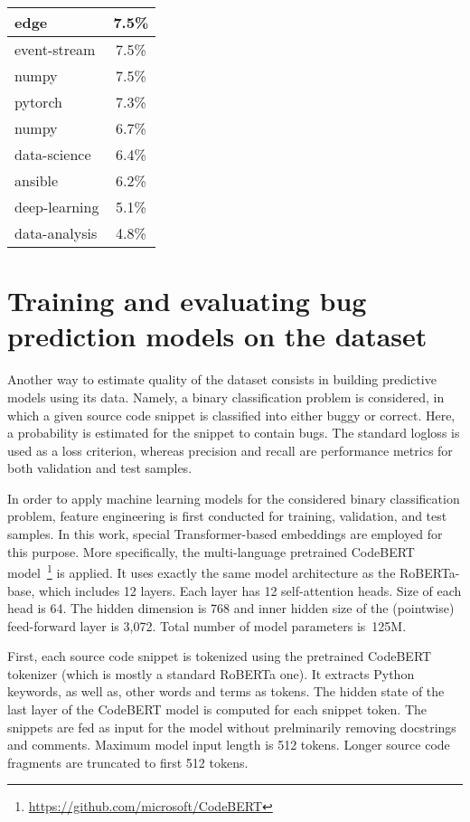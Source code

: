\documentclass[10pt,conference]{IEEEtran}
\begin{document}
\begin{table}[htbp]
\begin{center}
\begin{tabular}{| l | c |}
\hline
  edge &   7.5\color{lightgray}\% \\
\hline
  event-stream &   7.5\color{lightgray}\% \\
\hline
  numpy &   7.5\color{lightgray}\% \\
\hline
  pytorch &  7.3\color{lightgray}\% \\
\hline
  numpy &  6.7\color{lightgray}\% \\
\hline
  data-science &  6.4\color{lightgray}\% \\
\hline
  ansible &  6.2\color{lightgray}\% \\
\hline
  deep-learning &  5.1\color{lightgray}\% \\
\hline
  data-analysis &  4.8\color{lightgray}\% \\
\hline
\end{tabular}
\label{tab3}
\end{center}
\end{table}

\section{Training and evaluating bug prediction models on the dataset}\label{sec6}

Another way to estimate quality of the dataset consists in building predictive models using its data.
Namely, a binary classification problem is considered, in which a given source code
snippet is classified into either buggy or correct. Here, a probability is
estimated for the snippet to contain bugs. The standard logloss is used as a loss criterion, whereas precision and recall
are performance metrics for both validation and test samples. 

In order to apply machine learning models for the considered binary classification problem, feature engineering is first conducted 
 for training, validation, and test samples. In this work, special Transformer-based embeddings are employed for this purpose.
More specifically, the multi-language pretrained CodeBERT model~\cite{FengEtAl2020}\footnote{\url{https://github.com/microsoft/CodeBERT}} is applied.
It uses exactly
the same model architecture as the RoBERTa-base, which includes 12 layers. Each layer has 12 self-attention heads.
Size of each head is 64. The hidden dimension is 768
and inner hidden size of the (pointwise)  feed-forward layer is 3,072.
Total number of model parameters is~125M. 

First, each source code snippet is tokenized using the pretrained CodeBERT tokenizer (which is mostly a standard RoBERTa one). 
It extracts Python keywords, as well as, other words and terms as tokens.
The hidden state of the last layer of the CodeBERT model is computed for each snippet token.
The snippets are fed as input for the model without prelminarily removing docstrings and comments. Maximum model input length is 
512 tokens. Longer source code fragments are truncated to first 512 tokens.
\end{document}
